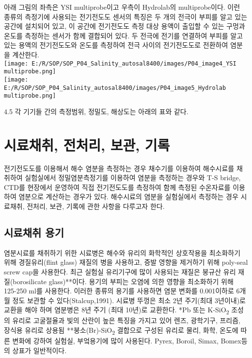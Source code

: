 \documentclass[
]{book}
\begin{document}
아래 그림의 좌측은 YSI multiprobe이고 우측이 Hydrolab의 multiprobe이다. 이런 종류의 측정기에 사용되는 전기전도도 센서의 특징은 두 개의 전극이 부피를 알고 있는 공간에 설치되어 있고, 이 공간에 전기전도도 측정 대상 용액이 출입할 수 있는 구멍과 온도를 측정하는 센서가 함께 결합되어 있다. 두 전극에 전기를 연결하여 부피를 알고 있는 용액의 전기전도도와 온도를 측정하여 전극 사이의 전기전도도로 전환하여 염분을 계산한다.\\
\texttt{[image: E:/R/SOP/SOP\_P04\_Salinity\_autosal8400/images/P04\_image4\_YSI multiprobe.png]}\\
\texttt{[image: E:/R/SOP/SOP\_P04\_Salinity\_autosal8400/images/P04\_image5\_Hydrolab multiprobe.png]}

4.5 각 기기들 간의 측정범위, 정밀도, 해상도는 아래의 표와 같다.

\hypertarget{uxc2dcuxb8ccuxcc44uxcde8-uxc804uxcc98uxb9ac-uxbcf4uxad00-uxae30uxb85d}{%
\section{시료채취, 전처리, 보관, 기록}\label{uxc2dcuxb8ccuxcc44uxcde8-uxc804uxcc98uxb9ac-uxbcf4uxad00-uxae30uxb85d}}

전기전도도를 이용해서 해수 염분을 측정하는 경우 채수기를 이용하여 해수시료를 채취하여 실험실에서 정밀염분측정기를 이용하여 염분을 측정하는 경우와 T-S bridge, CTD를 현장에서 운영하여 직접 전기전도도를 측정하여 함께 측정된 수온자료를 이용하여 염분으로 계산하는 경우가 있다. 해수시료의 염분을 실험실에서 측정하는 경우 시료채취, 전처리, 보관, 기록에 관한 사항을 다루고자 한다.

\hypertarget{uxc2dcuxb8ccuxcc44uxcde8-uxc6a9uxae30}{%
\subsection{시료채취 용기}\label{uxc2dcuxb8ccuxcc44uxcde8-uxc6a9uxae30}}

염분시료를 채취하기 위한 시료병은 해수와 유리의 화학적인 상호작용을 최소화하기 위해 경질유리(flint glass) 재질의 병을 사용하고, 증발 영향을 제거하기 위해 poly-seal screw cap을 사용한다. 최근 실험실 유리기구에 많이 사용되는 재질은 붕규산 유리 재질(borosilicate glass)**이다. 용기의 부피는 오염에 의한 영향을 최소화하기 위해 125-250 ml를 사용한다. 이러한 종류의 용기를 사용하면 염분 변화를 0.001이하로 6개월 정도 보관할 수 있다(Stalcup,1991). 시료병 뚜껑은 최소 2년 주기(최대 3년이내)로 교환을 해야 하며 염분병은 8년 주기 (최대 10년)로 교환한다.
*Pb 또는 K-SiO\textsubscript{2} 조성의 유리로 고굴절율과 빛의 산란이 높은 특징을 가지고 있어 렌즈, 광학기구, 프리즘, 장식용 유리로 상용됨
**붕소(Br)-SiO\textsubscript{2} 결합으로 구성된 유리로 물리, 화학, 온도에 따른 변화에 강하여 실험실, 부엌용기에 많이 사용된다. Pyrex, Boroil, Simax, Bomex등의 상표가 일반적이다.
\end{document}
